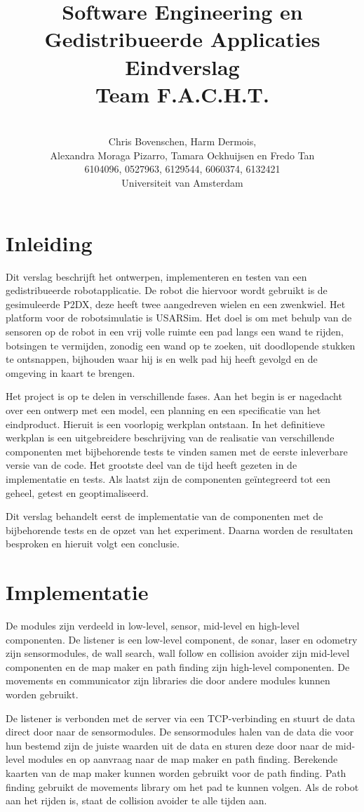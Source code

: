 \documentclass[a4paper,10pt]{article}
\title{Software Engineering en Gedistribueerde Applicaties \\[10pt]Eindverslag\\[25pt]Team F.A.C.H.T.}
\author{\\Chris Bovenschen, Harm Dermois, \\Alexandra Moraga Pizarro, Tamara Ockhuijsen en Fredo Tan \\[10pt]6104096, 0527963, 6129544, 6060374, 6132421 \\[25pt]Universiteit van Amsterdam}
\begin{document}
\maketitle

\newpage
\tableofcontents

\newpage
\section{Inleiding}
Dit verslag beschrijft het ontwerpen, implementeren en testen van een gedistribueerde robotapplicatie. De robot die hiervoor wordt gebruikt is de gesimuleerde P2DX, deze heeft twee aangedreven wielen en een zwenkwiel. Het platform voor de robotsimulatie is USARSim. Het doel is om met behulp van de sensoren op de robot in een vrij volle ruimte een pad langs een wand te rijden, botsingen te vermijden, zonodig een wand op te zoeken, uit doodlopende stukken te ontsnappen, bijhouden waar hij is en welk pad hij heeft gevolgd en de omgeving in kaart te brengen. 

Het project is op te delen in verschillende fases. Aan het begin is er nagedacht over een ontwerp met een model, een planning en een specificatie van het eindproduct. Hieruit is een voorlopig werkplan ontstaan. In het definitieve werkplan is een uitgebreidere beschrijving van de realisatie van verschillende componenten met bijbehorende tests te vinden samen met de eerste inleverbare versie van de code. Het grootste deel van de tijd heeft gezeten in de implementatie en tests. Als laatst zijn de componenten ge\"{i}ntegreerd tot een geheel, getest en geoptimaliseerd.

Dit verslag behandelt eerst de implementatie van de componenten met de bijbehorende tests en de opzet van het experiment. Daarna worden de resultaten besproken en hieruit volgt een conclusie.

\newpage

\section{Implementatie}
De modules zijn verdeeld in low-level, sensor, mid-level en high-level componenten. De listener is een low-level component, de sonar, laser en odometry zijn sensormodules, de wall search, wall follow en collision avoider zijn mid-level componenten en de map maker en path finding zijn high-level componenten. De movements en communicator zijn libraries die door andere modules kunnen worden gebruikt. 

De listener is verbonden met de server via een TCP-verbinding en stuurt de data direct door naar de sensormodules. De sensormodules halen van de data die voor hun bestemd zijn de juiste waarden uit de data en sturen deze door naar de mid-level modules en op aanvraag naar de map maker en path finding. Berekende kaarten van de map maker kunnen worden gebruikt voor de path finding. Path finding gebruikt de movements library om het pad te kunnen volgen. Als de robot aan het rijden is, staat de collision avoider te alle tijden aan.
\end{document}
